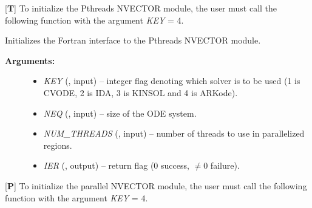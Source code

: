 \documentclass[letterpaper,10pt,english]{sphinxmanual}
\begin{document}
{[}\textbf{T}{]} To initialize the Pthreads NVECTOR module, the user must
call the following function with the argument \emph{KEY} = 4.

\begin{fulllineitems}
\label{f_interface/Usage:f/_/FNVINITS_PTHREADS}
Initializes the Fortran interface to the Pthreads NVECTOR module.
\begin{description}
\item[{\textbf{Arguments:}}] \leavevmode\begin{itemize}
\item {} 
\emph{KEY} (, input) -- integer flag denoting which solver
is to be used (1 is CVODE, 2 is IDA, 3 is KINSOL and 4 is ARKode).

\item {} 
\emph{NEQ} (, input) -- size of the ODE system.

\item {} 
\emph{NUM\_THREADS} (, input) -- number of threads to use in
parallelized regions.

\item {} 
\emph{IER} (, output) -- return flag (0 success, $\ne 0$ failure).

\end{itemize}

\end{description}

\end{fulllineitems}


{[}\textbf{P}{]} To initialize the parallel NVECTOR module, the user must
call the following function with the argument \emph{KEY} = 4.
\end{document}
